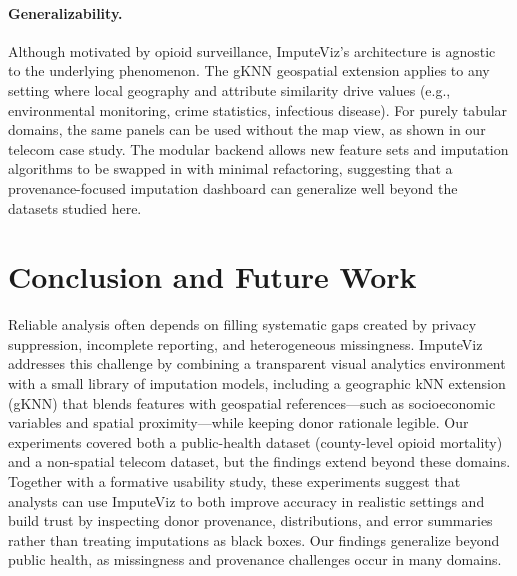 \documentclass{egpubl}
\newcommand{\gknn}{gKNN\xspace}
\newcommand{\tool}{ImputeViz\xspace}
\begin{document}
\paragraph*{Generalizability.}
Although motivated by opioid surveillance, \tool's architecture is agnostic to the underlying phenomenon. The gKNN geospatial extension applies to any setting where local geography and attribute similarity drive values (e.g., environmental monitoring, crime statistics, infectious disease). For purely tabular domains, the same panels can be used without the map view, as shown in our telecom case study. The modular backend allows new feature sets and imputation algorithms to be swapped in with minimal refactoring, suggesting that a provenance-focused imputation dashboard can generalize well beyond the datasets studied here.

\vspace{-4pt}
\section{Conclusion and Future Work}
\label{sec:conclusion}

Reliable analysis often depends on filling systematic gaps created by privacy suppression, incomplete reporting, and heterogeneous missingness. \tool addresses this challenge by combining a transparent visual analytics environment with a small library of imputation models, including a geographic kNN extension (\gknn) that blends features with geospatial references—such as socioeconomic variables and spatial proximity—while keeping donor rationale legible. Our experiments covered both a public-health dataset (county-level opioid mortality) and a non-spatial telecom dataset, but the findings extend beyond these domains. Together with a formative usability study, these experiments suggest that analysts can use ImputeViz to both improve accuracy in realistic settings and build trust by inspecting donor provenance, distributions, and error summaries rather than treating imputations as black boxes. Our findings generalize beyond public health, as missingness and provenance challenges occur in many domains.
\end{document}
